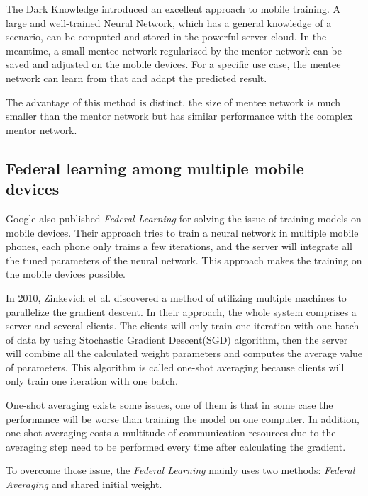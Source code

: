 \documentclass[article]{aaltoseries}
\begin{document}
The Dark Knowledge introduced an excellent approach to mobile training. 
A large and well-trained Neural Network, which has a general knowledge of a scenario, can be computed and stored in the powerful server cloud.
In the meantime, a small mentee network regularized by the mentor network can be saved and adjusted on the mobile devices.
For a specific use case, the mentee network can learn from that and adapt the predicted result. 



The advantage of this method is distinct, 
the size of mentee network is much smaller than the mentor network but has similar performance
with the complex mentor network. 


\subsection{Federal learning among multiple mobile devices}
\label{sub_sec:federal_learning}

Google also published \emph{Federal Learning} for solving the issue of training models on mobile devices.
Their approach tries to train a neural network in multiple mobile phones, each phone only trains a few iterations,
and the server will integrate all the tuned parameters of the neural network. 
This approach makes the training on the mobile devices possible.

In 2010, Zinkevich et al.\cite{Zinkevich2010} discovered a method of utilizing multiple machines to parallelize the gradient descent.
In their approach, the whole system comprises a server and several clients. 
The clients will only train one iteration with one batch of data by using Stochastic Gradient Descent(SGD) algorithm, 
then the server will combine all the calculated weight parameters and computes the average value of parameters.
This algorithm is called one-shot averaging because clients will only train one iteration with one batch.

One-shot averaging exists some issues, one of them is that in some case the performance will be worse than training
the model on one computer\cite{Shamir2013}. In addition, one-shot averaging costs a multitude of communication resources
due to the averaging step need to be performed every time after calculating the gradient.


To overcome those issue, the \emph{Federal Learning} mainly uses two methods: \emph{Federal Averaging} 
and shared initial weight.
\end{document}

